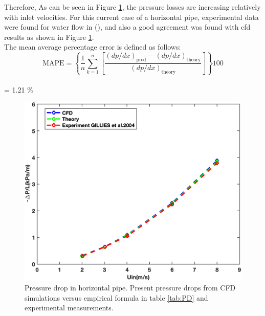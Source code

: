 \documentclass[11pt]{report}
\begin{document}
\begin{minipage}[t]{0.35\textwidth}
\begin{minipage}[t]{0.5\textwidth}
 Therefore, As can be seen in Figure \ref{horiz:theo}, the pressure losses are increasing relatively with inlet velocities. 
 For this current case of a horizontal pipe, experimental data were found for water flow in (\citet{Randal-2004}), and also a good agreement was found with cfd results as shown in Figure \ref{horiz:theo}.\\
The mean average percentage error is defined as follows:
%
 \footnotesize{$$
 \text{MAPE}=\left\{\frac{1}{n} \sum_{k=1}^{n}\left[\frac{(d p / d x)_{\text{pred}}-(d p / d x)_{\text{theory} }}{(d p / d x)_{\text{theory}}}\right]\right\} 100
 $$\\
  = 1.21 $\%$}
 \begin{figure}[ht!]
 \begin{center}
 \includegraphics[scale = 0.45]{figs/WH}
 \caption{ Pressure drop in horizontal pipe. 
 Present pressure drops from CFD simulations versus empirical formula in table \ref{tab:PD} and experimental measurements.}\label{horiz:theo}
 \end{center}
 \end{figure}




\end{minipage}
\end{minipage}
\end{document}
